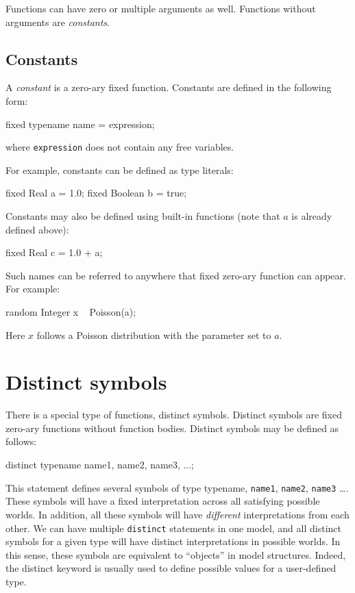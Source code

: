 \documentclass[12pt]{article}
\begin{document}
Functions can have zero or multiple arguments as well. Functions without arguments are \emph{constants}. 

\subsection{Constants}
A {\em constant} is a zero-ary fixed function.  Constants are defined in the following form:
\begin{blogcode}
fixed typename name = expression;
\end{blogcode} 
where \texttt{expression} does not contain any free variables. 

For example, constants can be defined as type literals:
\begin{blogcode}
fixed Real a = 1.0;
fixed Boolean b = true;
\end{blogcode}

Constants may also be defined using built-in functions (note that $a$ is already defined above):
\begin{blogcode}
fixed Real c = 1.0 + a;
\end{blogcode}

Such names can be referred to anywhere that fixed zero-ary function can appear.
For example:
\begin{blogcode}
random Integer x ~ Poisson(a);
\end{blogcode}
Here $x$ follows a Poisson distribution with the parameter set to $a$.

\section{Distinct symbols}
There is a special type of functions, distinct symbols. 
Distinct symbols are fixed zero-ary functions without function bodies.  Distinct symbols may be defined as follows:
\begin{blogcode}
distinct typename name1, name2, name3, ...;
\end{blogcode}
This statement defines several symbols of type typename, \texttt{name1}, \texttt{name2}, \texttt{name3} \dots.
These symbols will have a fixed interpretation across all satisfying possible worlds. In addition, all these symbols will have \emph{different} interpretations from each other. 
We can have multiple \texttt{distinct} statements in one \bl model, and all distinct symbols for a given type will have 
distinct interpretations in possible worlds. In this sense, these symbols are equivalent to ``objects'' in model structures.
Indeed, the distinct keyword is usually used to define possible values for a user-defined type.  
\end{document}
